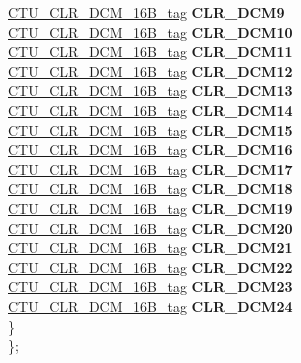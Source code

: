 \begin{DoxyCompactItemize}
\begin{tabbing}
\>\>\mbox{\hyperlink{unionCTU__CLR__DCM__16B__tag}{CTU\_CLR\_DCM\_16B\_tag}} {\bfseries CLR\_DCM9}\\
\>\>\mbox{\hyperlink{unionCTU__CLR__DCM__16B__tag}{CTU\_CLR\_DCM\_16B\_tag}} {\bfseries CLR\_DCM10}\\
\>\>\mbox{\hyperlink{unionCTU__CLR__DCM__16B__tag}{CTU\_CLR\_DCM\_16B\_tag}} {\bfseries CLR\_DCM11}\\
\>\>\mbox{\hyperlink{unionCTU__CLR__DCM__16B__tag}{CTU\_CLR\_DCM\_16B\_tag}} {\bfseries CLR\_DCM12}\\
\>\>\mbox{\hyperlink{unionCTU__CLR__DCM__16B__tag}{CTU\_CLR\_DCM\_16B\_tag}} {\bfseries CLR\_DCM13}\\
\>\>\mbox{\hyperlink{unionCTU__CLR__DCM__16B__tag}{CTU\_CLR\_DCM\_16B\_tag}} {\bfseries CLR\_DCM14}\\
\>\>\mbox{\hyperlink{unionCTU__CLR__DCM__16B__tag}{CTU\_CLR\_DCM\_16B\_tag}} {\bfseries CLR\_DCM15}\\
\>\>\mbox{\hyperlink{unionCTU__CLR__DCM__16B__tag}{CTU\_CLR\_DCM\_16B\_tag}} {\bfseries CLR\_DCM16}\\
\>\>\mbox{\hyperlink{unionCTU__CLR__DCM__16B__tag}{CTU\_CLR\_DCM\_16B\_tag}} {\bfseries CLR\_DCM17}\\
\>\>\mbox{\hyperlink{unionCTU__CLR__DCM__16B__tag}{CTU\_CLR\_DCM\_16B\_tag}} {\bfseries CLR\_DCM18}\\
\>\>\mbox{\hyperlink{unionCTU__CLR__DCM__16B__tag}{CTU\_CLR\_DCM\_16B\_tag}} {\bfseries CLR\_DCM19}\\
\>\>\mbox{\hyperlink{unionCTU__CLR__DCM__16B__tag}{CTU\_CLR\_DCM\_16B\_tag}} {\bfseries CLR\_DCM20}\\
\>\>\mbox{\hyperlink{unionCTU__CLR__DCM__16B__tag}{CTU\_CLR\_DCM\_16B\_tag}} {\bfseries CLR\_DCM21}\\
\>\>\mbox{\hyperlink{unionCTU__CLR__DCM__16B__tag}{CTU\_CLR\_DCM\_16B\_tag}} {\bfseries CLR\_DCM22}\\
\>\>\mbox{\hyperlink{unionCTU__CLR__DCM__16B__tag}{CTU\_CLR\_DCM\_16B\_tag}} {\bfseries CLR\_DCM23}\\
\>\>\mbox{\hyperlink{unionCTU__CLR__DCM__16B__tag}{CTU\_CLR\_DCM\_16B\_tag}} {\bfseries CLR\_DCM24}\\
\>\} \\
\}; \\


\end{tabbing}
\end{DoxyCompactItemize}
